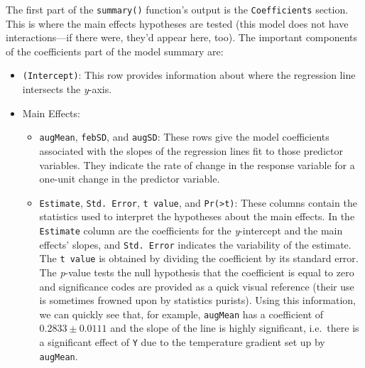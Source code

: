 \documentclass[
  letterpaper,
]{book}
\providecommand{\tightlist}{%
  \setlength{\itemsep}{0pt}\setlength{\parskip}{0pt}}\usepackage{longtable,booktabs,array}
\begin{document}
The first part of the \texttt{summary()} function's output is the
\texttt{Coefficients} section. This is where the main effects hypotheses
are tested (this model does not have interactions---if there were,
they'd appear here, too). The important components of the coefficients
part of the model summary are:

\begin{itemize}
\tightlist
\item
  \texttt{(Intercept)}: This row provides information about where the
  regression line intersects the \emph{y}-axis.
\item
  Main Effects:

  \begin{itemize}
  \tightlist
  \item
    \texttt{augMean}, \texttt{febSD}, and \texttt{augSD}: These rows
    give the model coefficients associated with the slopes of the
    regression lines fit to those predictor variables. They indicate the
    rate of change in the response variable for a one-unit change in the
    predictor variable.
  \item
    \texttt{Estimate}, \texttt{Std.\ Error}, \texttt{t\ value}, and
    \texttt{Pr(\textgreater{}\textbar{}t\textbar{})}: These columns
    contain the statistics used to interpret the hypotheses about the
    main effects. In the \texttt{Estimate} column are the coefficients
    for the \emph{y}-intercept and the main effects' slopes, and
    \texttt{Std.\ Error} indicates the variability of the estimate. The
    \texttt{t\ value} is obtained by dividing the coefficient by its
    standard error. The \emph{p}-value tests the null hypothesis that
    the coefficient is equal to zero and significance codes are provided
    as a quick visual reference (their use is sometimes frowned upon by
    statistics purists). Using this information, we can quickly see
    that, for example, \texttt{augMean} has a coefficient of
    \(0.2833 \pm 0.0111\) and the slope of the line is highly
    significant, i.e.~there is a significant effect of \texttt{Y} due to
    the temperature gradient set up by \texttt{augMean}.
  \end{itemize}
\end{itemize}
\end{document}
